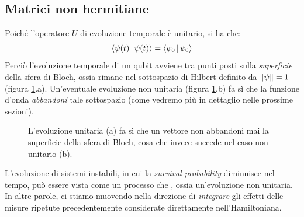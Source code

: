 \documentclass[../../InformazioneQuantistica.tex]{subfiles}
\begin{document}
\subsection{Matrici  non hermitiane}

Poiché l'operatore $U$ di evoluzione temporale è unitario, si ha che:
\begin{align*}
\Braket{\psi(t)|\psi(t)} = \Braket{\psi_0|\psi_0}
\end{align*} 
Perciò l'evoluzione temporale di un qubit avviene tra punti posti sulla \textit{superficie} della sfera di Bloch, ossia rimane nel sottospazio di Hilbert definito da $\left\lVert\psi\right\rVert=1$ (figura \ref{fig:sfera-bloch-evoluzione}.a). Un'eventuale evoluzione non unitaria (figura \ref{fig:sfera-bloch-evoluzione}.b) fa sì che la funzione d'onda \textit{abbandoni} tale sottospazio (come vedremo più in dettaglio nelle prossime sezioni).

\begin{figure}[H]
\centering

\caption{L'evoluzione unitaria (a) fa sì che un vettore non abbandoni mai la superficie della sfera di Bloch, cosa che invece succede nel caso non unitario (b).\label{fig:sfera-bloch-evoluzione}}
\end{figure}

L'evoluzione di sistemi instabili, in cui la \textit{survival probability} diminuisce nel tempo, può essere vista come un processo che , ossia un'evoluzione non unitaria. In altre parole, ci stiamo muovendo nella direzione di \textit{integrare} gli effetti delle misure ripetute precedentemente considerate direttamente nell'Hamiltoniana.\\
\end{document}
